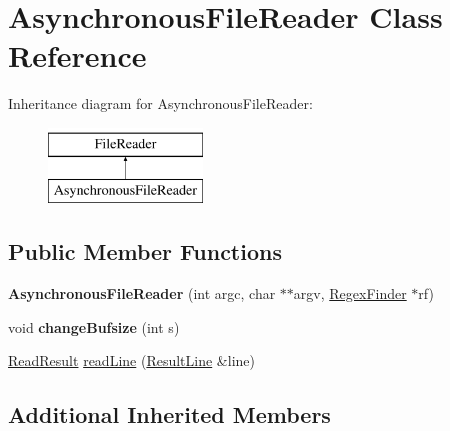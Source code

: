 \hypertarget{class_asynchronous_file_reader}{\section{Asynchronous\-File\-Reader Class Reference}
\label{class_asynchronous_file_reader}
}
Inheritance diagram for Asynchronous\-File\-Reader\-:\begin{figure}[H]
\begin{center}
\leavevmode
\includegraphics[height=2.000000cm]{class_asynchronous_file_reader}
\end{center}
\end{figure}
\subsection*{Public Member Functions}
\begin{DoxyCompactItemize}
\item 
\hypertarget{class_asynchronous_file_reader_ae9012d3d6d8f9396a67cb9a58c263d0d}{{\bfseries Asynchronous\-File\-Reader} (int argc, char $\ast$$\ast$argv, \hyperlink{class_regex_finder}{Regex\-Finder} $\ast$rf)}\label{class_asynchronous_file_reader_ae9012d3d6d8f9396a67cb9a58c263d0d}

\item 
\hypertarget{class_asynchronous_file_reader_a708ad5d93f5c04b87d1075b1fbe073d4}{void {\bfseries change\-Bufsize} (int s)}\label{class_asynchronous_file_reader_a708ad5d93f5c04b87d1075b1fbe073d4}

\item 
\hyperlink{class_file_reader_a8e801198c62f657dd1dff8fd8dbe796f}{Read\-Result} \hyperlink{class_asynchronous_file_reader_afe3fc7c60e31729ac786596ad0c4deaf}{read\-Line} (\hyperlink{class_result_line}{Result\-Line} \&line)
\end{DoxyCompactItemize}
\subsection*{Additional Inherited Members}


